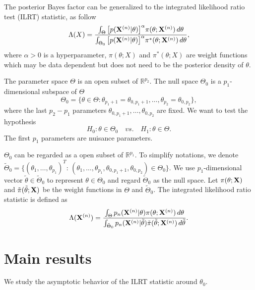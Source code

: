 \documentclass[3p]{elsarticle}
\theoremstyle{plain}
\theoremstyle{definition}
\theoremstyle{remark}
\begin{document}
 The posterior Bayes factor can be generalized to the integrated likelihood ratio test (ILRT) statistic, as follow  
\begin{equation}
    \Lambda (X)=\frac{\int_{\Theta} \big[p(\mathbf{X}^{(n)}|\theta)\big]^{\alpha}\pi(\theta;\mathbf{X}^{(n)})\,d\theta}{\int_{\Theta_0} \big[p(\mathbf{X}^{(n)}|\theta)\big]^{\alpha}\pi^*(\theta;\mathbf{X}^{(n)})\,d\theta},
\end{equation}
where $\alpha>0$ is a hyperparameter, $\pi(\theta;X)$ and $\pi^*(\theta;X)$ are weight functions which may be data dependent but does not need to be the posterior density of $\theta$.

The parameter space $\Theta$ is an open subset of $\mathbb{R}^{p_2}$. The null space $\Theta_0$ is a $p_1$-dimensional subspace of $\Theta$
\begin{equation}
    \Theta_0=\{\theta\in\Theta:\theta_{p_1+1}=\theta_{0,{p_1+1}},\ldots,\theta_{p_2}=\theta_{0,{p_2}}\},
\end{equation}
where the last $p_2-p_1$ parameters $\theta_{0,{p_1+1}},\ldots,\theta_{0,{p_2}}$ are fixed. We want to test the hypothesis
\begin{equation}
H_0:\theta\in \Theta_0\quad vs. \quad H_1:\theta\in \Theta.
\end{equation}
The first $p_1$ parameters are nuisance parameters.

$\Theta_0$ can be regarded as a open subset of $\mathbb{R}^{p_1}$. To simplify notations, we denote  $\tilde{\Theta}_0=\{{(\theta_1,\ldots,\theta_{p_1})}^T:\, (\theta_1,\ldots,\theta_{p_1},\theta_{0,p_1+1},\theta_{0,p_2})\in \Theta_0\}$.
We use $p_1$-dimensional vector $\tilde{\theta}\in
\tilde{\Theta}_0$ to represent $\theta\in\Theta_0$ and regard $\tilde{\Theta}_0$ as the null space.
Let $\pi(\theta;\mathbf{X})$ and $\tilde{\pi}(\tilde{\theta};\mathbf{X})$ be the weight functions in $\Theta$ and $\tilde{\Theta}_0$.
The integrated likelihood ratio statistic is defined as
\begin{equation}\label{likelihoodRatio}
    \Lambda (\mathbf{X}^{(n)})=\frac{\int_{\Theta} p_n(\mathbf{X}^{(n)}|\theta)\pi(\theta;\mathbf{X}^{(n)})\,d\theta}{\int_{\tilde{\Theta}_0} p_n(\mathbf{X}^{(n)}|\tilde{\theta})\tilde{\pi}(\tilde{\theta};\mathbf{X}^{(n)})\,d\tilde{\theta}}.
\end{equation}

\section{Main results}


We study the asymptotic behavior of the ILRT statistic around $\theta_0$.
\end{document}
